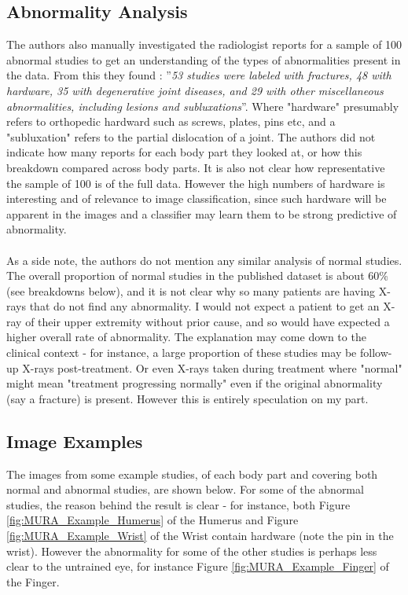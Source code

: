 \documentclass[11pt]{article} %
\theoremstyle{plain}
\theoremstyle{definition}
\begin{document}
\subsection{Abnormality Analysis}
The authors also manually investigated the radiologist reports for a sample of 100 abnormal studies to get an understanding of the types of abnormalities present in the data. From this they found \cite{MURA2017}: ''\textit{53 studies were labeled with fractures, 48 with hardware, 35 with degenerative joint diseases, and 29 with other miscellaneous abnormalities, including lesions and subluxations}''. Where "hardware" presumably refers to orthopedic hardward such as screws, plates, pins etc, and a "subluxation" refers to the partial dislocation of a joint. The authors did not indicate how many reports for each body part they looked at, or how this breakdown compared across body parts. It is also not clear how representative the sample of 100 is of the full data. However the high numbers of hardware is interesting and of relevance to image classification, since such hardware will be apparent in the images and a classifier may learn them to be strong predictive of abnormality.
\\
\\
\noindent
As a side note, the authors do not mention any similar analysis of normal studies. The overall proportion of normal studies in the published dataset is about 60\% (see breakdowns below), and it is not clear why so many patients are having X-rays that do not find any abnormality. I would not expect a patient to get an X-ray of their upper extremity without prior cause, and so would have expected a higher overall rate of abnormality. The explanation may come down to the clinical context - for instance, a large proportion of these studies may be follow-up X-rays post-treatment. Or even X-rays taken during treatment where "normal" might mean "treatment progressing normally" even if the original abnormality (say a fracture) is present. However this is entirely speculation on my part.   

\subsection{Image Examples}
The images from some example studies, of each body part and covering both normal and abnormal studies, are shown below. For some of the abnormal studies, the reason behind the result is clear - for instance, both Figure \ref{fig:MURA_Example_Humerus} of the Humerus and Figure \ref{fig:MURA_Example_Wrist} of the Wrist contain hardware (note the pin in the wrist). However the abnormality for some of the other studies is perhaps less clear to the untrained eye, for instance Figure \ref{fig:MURA_Example_Finger} of the Finger.
\end{document}
